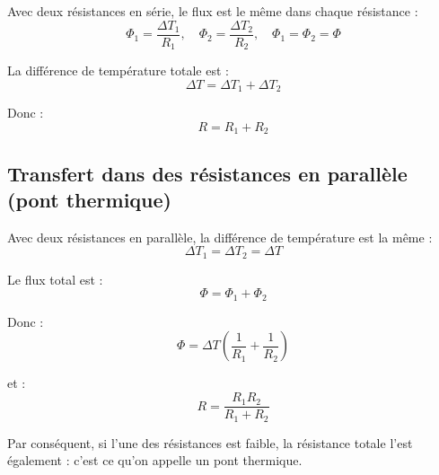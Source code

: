 \documentclass[11pt]{article}
\begin{document}
	Avec deux résistances en série, le flux est le même dans chaque résistance :
	\[
	\Phi_1 = \frac{\Delta T_1}{R_1}, \quad
	\Phi_2 = \frac{\Delta T_2}{R_2}, \quad
	\Phi_1 = \Phi_2 = \Phi
	\]
	
	La différence de température totale est :
	\[
	\Delta T = \Delta T_1 + \Delta T_2
	\]
	
	Donc :
	\[
	R = R_1 + R_2
	\]
	
	\subsection*{Transfert dans des résistances en parallèle (pont thermique)}
	
	Avec deux résistances en parallèle, la différence de température est la même :
	\[
	\Delta T_1 = \Delta T_2 = \Delta T
	\]
	
	Le flux total est :
	\[
	\Phi = \Phi_1 + \Phi_2
	\]
	
	Donc :
	\[
	\Phi = \Delta T \left( \frac{1}{R_1} + \frac{1}{R_2} \right)
	\]
	
	et :
	\[
	R = \frac{R_1 R_2}{R_1 + R_2}
	\]
	
	Par conséquent, si l’une des résistances est faible, la résistance totale l’est également : c’est ce qu’on appelle un pont thermique.
	
\end{document}
